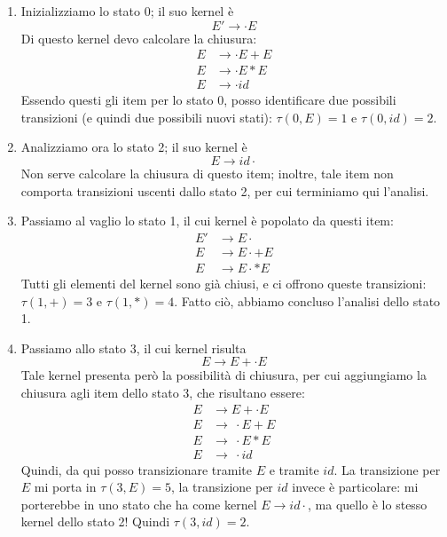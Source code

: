 \documentclass[class=book, crop=false, oneside, 12pt]{standalone}
\begin{document}
\begin{enumerate}
    \item Inizializziamo lo stato 0; il suo kernel è 
    \begin{equation*}
        E' \to \cdot E
    \end{equation*}
    Di questo kernel devo calcolare la chiusura:
    \begin{align*}
        E &\to \cdot E+E \\
        E &\to \cdot E*E \\
        E &\to \cdot id
    \end{align*}
    Essendo questi gli item per lo stato 0, posso identificare due possibili transizioni (e quindi due possibili nuovi stati): \(\tau(0,E)=1 \textrm{ e } \tau(0,id)=2\).
    \item Analizziamo ora lo stato 2; il suo kernel è 
    \begin{equation*}
        E \to id \cdot    
    \end{equation*}
    Non serve calcolare la chiusura di questo item; inoltre, tale item non comporta transizioni uscenti dallo stato 2, per cui terminiamo qui l'analisi.
    \item Passiamo al vaglio lo stato 1, il cui kernel è popolato da questi item:
    \begin{align*}
        E' &\to E \cdot\\
        E  &\to E \cdot +E \\
        E  &\to E \cdot *E
    \end{align*}
    Tutti gli elementi del kernel sono già chiusi, e ci offrono queste transizioni: \(\tau(1,+)=3 \textrm{ e } \tau(1,*)=4\). Fatto ciò, abbiamo concluso l'analisi dello stato 1.
    \item Passiamo allo stato 3, il cui kernel risulta
    \begin{equation*}
        E \to E+ \cdot E
    \end{equation*}
    Tale kernel presenta però la possibilità di chiusura, per cui aggiungiamo la chiusura agli item dello stato 3, che risultano essere:
    \begin{align*}
        E &\to E+ \cdot E \\
        E &\to\ \cdot E+E \\
        E &\to\ \cdot E*E \\
        E &\to\ \cdot id
    \end{align*}
    Quindi, da qui posso transizionare tramite \(E\) e tramite \(id\). La transizione per \(E\) mi porta in \(\tau(3,E)=5\), la transizione per \(id\) invece è particolare: mi porterebbe in uno stato che ha come kernel \(E \to id\cdot\), ma quello è lo stesso kernel dello stato 2! Quindi \(\tau(3,id)=2\).

\end{enumerate}
\end{document}
